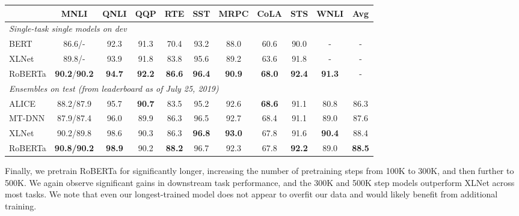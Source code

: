 \documentclass[11pt]{article}
\newcommand{\ourmodel}{RoBERTa}
\newcommand{\bertlarge}{BERT}
\newcommand{\xlnetlarge}{XLNet}
\begin{document}
\begin{table*}[t]
\begin{center}
\begin{tabular}{lcccccccccc}
\toprule
& \bf MNLI & \bf QNLI & \bf QQP & \bf RTE & \bf SST & \bf MRPC & \bf CoLA & \bf STS & \bf WNLI & \bf Avg \\
\midrule 
\multicolumn{10}{l}{\textit{Single-task single models on dev}}\\
\bertlarge{} & 86.6/- & 92.3 & 91.3 & 70.4 & 93.2 & 88.0 & 60.6 & 90.0 & - & -\\
\xlnetlarge{} & 89.8/- & 93.9 & 91.8 & 83.8 & 95.6 & 89.2 & 63.6 & 91.8 & - & -\\
\ourmodel{} & \textbf{90.2}/\textbf{90.2} & \textbf{94.7} & \textbf{92.2} & \textbf{86.6} & \textbf{96.4} & \textbf{90.9} & \textbf{68.0} & \textbf{92.4} & \textbf{91.3} & - \\
\midrule
\multicolumn{10}{l}{\textit{Ensembles on test (from leaderboard as of July 25, 2019)}} \\
ALICE & 88.2/87.9 & 95.7 & \textbf{90.7} & 83.5 & 95.2 & 92.6 & \textbf{68.6} & 91.1 & 80.8 & 86.3 \\
MT-DNN & 87.9/87.4 & 96.0 & 89.9 & 86.3 & 96.5 & 92.7 & 68.4 & 91.1 & 89.0 & 87.6 \\
XLNet  & 90.2/89.8 & 98.6 & 90.3 & 86.3 & \textbf{96.8} & \textbf{93.0} & 67.8 & 91.6 & \textbf{90.4} & 88.4 \\
\ourmodel{} & \textbf{90.8/90.2} & \textbf{98.9} & 90.2 & \textbf{88.2} & 96.7 & 92.3 & 67.8 & \textbf{92.2} & 89.0 & \bf 88.5 \\
\bottomrule
\end{tabular}
\end{center}
\caption{
Results on GLUE. All results are based on a 24-layer architecture.
\bertlarge{} and \xlnetlarge{} results are from  and , respectively.
\ourmodel{} results on the development set are a median over five runs.
\ourmodel{} results on the test set are ensembles of \emph{single-task} models.
For RTE, STS and MRPC we finetune starting from the MNLI model instead of the baseline pretrained model.
Averages are obtained from the GLUE leaderboard.
}
\label{tab:roberta_glue}
\end{table*} 
Finally, we pretrain \ourmodel{} for significantly longer, increasing the number of pretraining steps from 100K to 300K, and then further to 500K.
We again observe significant gains in downstream task performance, and the 300K and 500K step models outperform \xlnetlarge{} across most tasks.
We note that even our longest-trained model does not appear to overfit our data and would likely benefit from additional training.
\end{document}
